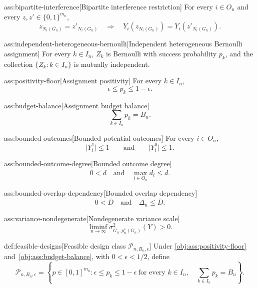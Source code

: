 \begin{assumptionv}{ass:bipartite-interference}[Bipartite interference restriction]
For every $i\in O_n$ and every $z,z'\in\{0,1\}^{m_n}$,
\[
z_{N_i(G_n)}=z'_{N_i(G_n)}
\quad\Longrightarrow\quad
Y_i\!\left(z_{N_i(G_n)}\right)=Y_i\!\left(z'_{N_i(G_n)}\right).
\]
\end{assumptionv}

\begin{assumptionv}{ass:independent-heterogeneous-bernoulli}[Independent heterogeneous Bernoulli assignment]
For every $k\in I_n$, $Z_k$ is Bernoulli with success probability $p_k$, and the collection $\{Z_k:k\in I_n\}$ is mutually independent.
\end{assumptionv}

\begin{assumptionv}{ass:positivity-floor}[Assignment positivity]
For every $k\in I_n$,
\[
\epsilon\leq p_k\leq 1-\epsilon.
\]
\end{assumptionv}

\begin{assumptionv}{ass:budget-balance}[Assignment budget balance]
\[
\sum_{k\in I_n}p_k=B_n.
\]
\end{assumptionv}

\begin{assumptionv}{ass:bounded-outcomes}[Bounded potential outcomes]
For every $i\in O_n$,
\[
\lvert Y_i^1\rvert\leq 1
\qquad\text{and}\qquad
\lvert Y_i^0\rvert\leq 1.
\]
\end{assumptionv}

\begin{assumptionv}{ass:bounded-outcome-degree}[Bounded outcome degree]
\[
0 < \bar d
\quad\text{and}\quad
\max_{i\in O_n} d_i \leq \bar d.
\]
\end{assumptionv}

\begin{assumptionv}{ass:bounded-overlap-dependency}[Bounded overlap dependency]
\[
0 < \bar D \quad\text{and}\quad \Delta_n \le \bar D.
\]
\end{assumptionv}

\begin{assumptionv}{ass:variance-nondegenerate}[Nondegenerate variance scale]
\[
\liminf_{n\to\infty}\sigma^2_{G_n,p_n^*(G_n)}(Y)>0.
\]
\end{assumptionv}

\begin{definitionv}{def:feasible-designs}[Feasible design class $\mathcal P_{n,B_n,\epsilon}$]
Under \cref{obj:ass:positivity-floor} and~\cref{obj:ass:budget-balance}, with \(0<\epsilon<1/2\), define
\[
\mathcal P_{n,B_n,\epsilon}
=
\left\{
p\in[0,1]^{m_n}:
\epsilon\le p_k\le 1-\epsilon\ \text{for every } k\in I_n,
\quad
\sum_{k\in I_n}p_k=B_n
\right\}.
\]
\end{definitionv}

